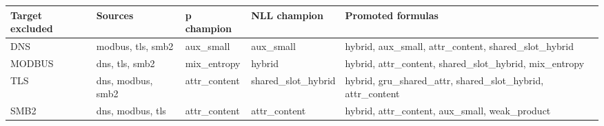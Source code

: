 \begin{tabular}{lllll}
\hline
Target excluded & Sources & p champion & NLL champion & Promoted formulas \\
\hline
DNS & modbus, tls, smb2 & aux\_small & aux\_small & hybrid, aux\_small, attr\_content, shared\_slot\_hybrid \\
MODBUS & dns, tls, smb2 & mix\_entropy & hybrid & hybrid, attr\_content, shared\_slot\_hybrid, mix\_entropy \\
TLS & dns, modbus, smb2 & attr\_content & shared\_slot\_hybrid & hybrid, gru\_shared\_attr, shared\_slot\_hybrid, attr\_content \\
SMB2 & dns, modbus, tls & attr\_content & attr\_content & hybrid, attr\_content, aux\_small, weak\_product \\
\hline
\end{tabular}
